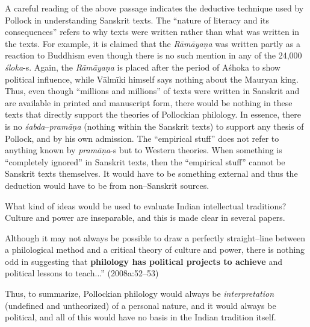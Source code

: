 A careful reading of the above passage indicates the deductive technique used by Pollock in understanding Sanskrit texts. The “nature of literacy and its consequences” refers to why texts were written rather than what was written in the texts. For example, it is claimed that the \textit{Rāmāyaṇa} was written partly as a reaction to Buddhism even though there is no such mention in any of the 24,000 \textit{śloka}-s. Again, the \textit{Rāmāyaṇa} is placed after the period of Aśhoka to show political influence, while Vālmīki himself says nothing about the Mauryan king. Thus, even though “millions and millions” of texts were written in Sanskrit and are available in printed and manuscript form, there would be nothing in these texts that directly support the theories of Pollockian philology. In essence, there is no \textit{śabda}–\textit{pramāṇa} (nothing within the Sanskrit texts) to support any thesis of Pollock, and by his own admission. The “empirical stuff” does not refer to anything known by \textit{pramāṇa}-s but to Western theories. When something is “completely ignored” in Sanskrit texts, then the “empirical stuff” cannot be Sanskrit texts themselves. It would have to be something external and thus the deduction would have to be from non–Sanskrit sources.

What kind of ideas would be used to evaluate Indian intellectual traditions? Culture and power are inseparable, and this is made clear in several papers.

\begin{myquote}
Although it may not always be possible to draw a perfectly straight–line between a philological method and a critical theory of culture and power, there is nothing odd in suggesting that \textbf{philology has political projects to achieve} and political lessons to teach...” (2008a:52–53)
\end{myquote}

Thus, to summarize, Pollockian philology would always be \textit{interpretation} (undefined and untheorized) of a personal nature, and it would always be political, and all of this would have no basis in the Indian tradition itself.

